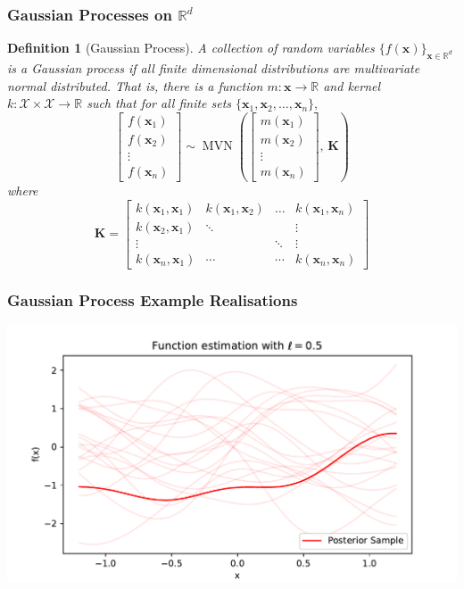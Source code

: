 \documentclass{beamer}
\DeclareMathOperator{\MVN}{MVN}
\newcommand{\R}{\mathbb{R}}
\newtheorem{definnn}{Definition}
\begin{document}
\begin{frame}
    \frametitle{Gaussian Processes on $\mathbb{R}^d$}
    \begin{definnn}[Gaussian Process]
        A collection of random variables $\{f(\mathbf{x})\}_{\mathbf{x}\in\mathbb{R}^d}$ is a \emph{Gaussian process} if all finite dimensional distributions are multivariate normal distributed. That is, there is a function $m:\mathcal{\mathbf{x}}\to\R$ and kernel $k:\mathcal{X}\times\mathcal{X}\to \R$ such that for all finite sets $\{\mathbf{x}_1, \mathbf{x}_2, \dots, \mathbf{x}_n\},$
        $$\begin{bmatrix}
                f(\mathbf{x}_1) \\ f(\mathbf{x}_2)\\ \vdots\\ f(\mathbf{x}_n)
            \end{bmatrix} \sim
            \MVN\left(\begin{bmatrix}
                m(\mathbf{x}_1) \\ m(\mathbf{x}_2)\\ \vdots\\ m(\mathbf{x}_n)
            \end{bmatrix},\, \mathbf{K}\right)$$
        where $$\mathbf{K} = \begin{bmatrix}
                k(\mathbf{x}_1, \mathbf{x}_1) & k(\mathbf{x}_1, \mathbf{x}_2) & \dots  & k(\mathbf{x}_1, \mathbf{x}_n) \\
                k(\mathbf{x}_2, \mathbf{x}_1) & \ddots                        &        & \vdots                        \\
                \vdots                        &                               & \ddots & \vdots                        \\
                k(\mathbf{x}_n, \mathbf{x}_1) & \cdots                        & \cdots & k(\mathbf{x}_n, \mathbf{x}_n)
            \end{bmatrix}$$
    \end{definnn}
\end{frame}

\begin{frame}
    \frametitle{Gaussian Process Example Realisations}
    \includegraphics[width=\textwidth]{exponentiated_ell_5_tenths.pdf}
\end{frame}
\end{document}
